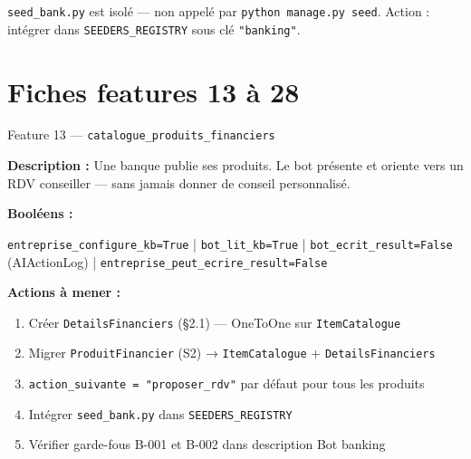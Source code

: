 \documentclass[11pt,a4paper]{article}
\newcommand{\slug}[1]{\texttt{\color{AGTDark}#1}}
\begin{document}
\begin{warnbox}
\slug{seed\_bank.py} est isolé — non appelé par \texttt{python manage.py seed}.
Action : intégrer dans \slug{SEEDERS\_REGISTRY} sous clé \texttt{"banking"}.
\end{warnbox}

\section{Fiches features 13 à 28}

\begin{featurebox}{Feature 13 — \slug{catalogue\_produits\_financiers}}

\textbf{Description :} Une banque publie ses produits. Le bot présente et oriente
vers un RDV conseiller — sans jamais donner de conseil personnalisé.

\textbf{Booléens :}
\begin{decisionbox}
\texttt{entreprise\_configure\_kb=True} | \texttt{bot\_lit\_kb=True} |
\texttt{bot\_ecrit\_result=False} (AIActionLog) | \texttt{entreprise\_peut\_ecrire\_result=False}
\end{decisionbox}

\textbf{Actions à mener :}
\begin{enumerate}
  \item Créer \slug{DetailsFinanciers} (§2.1) — OneToOne sur \slug{ItemCatalogue}
  \item Migrer \slug{ProduitFinancier} (S2) → \slug{ItemCatalogue} + \slug{DetailsFinanciers}
  \item \slug{action\_suivante = "proposer\_rdv"} par défaut pour tous les produits
  \item Intégrer \slug{seed\_bank.py} dans \slug{SEEDERS\_REGISTRY}
  \item Vérifier garde-fous B-001 et B-002 dans description Bot banking
\end{enumerate}

\end{featurebox}

\bigskip
\end{document}
